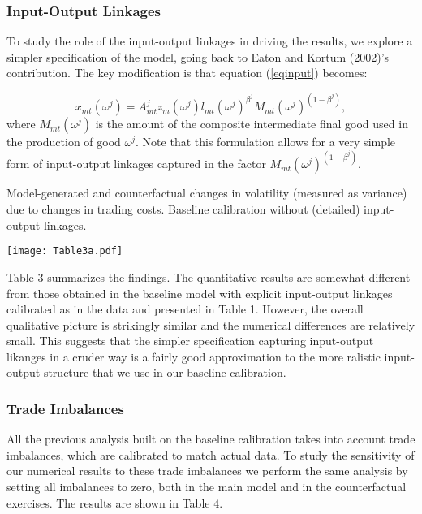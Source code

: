 \documentclass[12pt]{article}
\begin{document}
\subsubsection{Input-Output Linkages}

To study the role of the input-output linkages in driving the results, we
explore a simpler specification of the model, going back to Eaton and Kortum
(2002)'s contribution. The key modification is that equation (\ref{eqinput})
becomes:

\begin{equation}
x_{mt}(\omega ^{j})=A_{mt}^{j}z_{m}(\omega ^{j})l_{mt}(\omega ^{j})^{\beta
^{j}}M_{mt}(\omega ^{j})^{(1-\beta ^{j})},  \label{iosimple}
\end{equation}%
where $M_{mt}(\omega ^{j})$ is the amount of the composite intermediate
final good used in the production of good $\omega ^{j}$. Note that this
formulation allows for a very simple form of input-output linkages captured
in the factor $M_{mt}(\omega ^{j})^{(1-\beta ^{j})}$.

\begin{table}[h]
\caption{Model-generated and counterfactual changes in volatility (measured
as variance) due to changes in trading costs. Baseline calibration without
(detailed) input-output linkages.}\centering\texttt{[image: Table3a.pdf]}
\end{table}

Table $3$ summarizes the findings. The quantitative results are somewhat
different from those obtained in the baseline model with explicit
input-output linkages calibrated as in the data and presented in Table 1.
However, the overall qualitative picture is strikingly similar and the
numerical differences are relatively small. This suggests that the simpler
specification capturing input-output likanges in a cruder way is a fairly
good approximation to the more ralistic input-output structure that we use
in our baseline calibration.

\subsubsection{Trade Imbalances}

All the previous analysis built on the baseline calibration takes into
account trade imbalances, which are calibrated to match actual data. To
study the sensitivity of our numerical results to these trade imbalances we
perform the same analysis by setting all imbalances to zero, both in the
main model and in the counterfactual exercises. The results are shown in
Table $4.$
\end{document}
